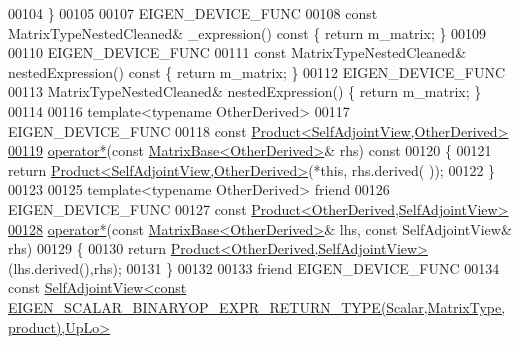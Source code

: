 \begin{DoxyCode}
00104     \}
00105 
00107     EIGEN\_DEVICE\_FUNC
00108     \textcolor{keyword}{const} MatrixTypeNestedCleaned& \_expression()\textcolor{keyword}{ const }\{ \textcolor{keywordflow}{return} m\_matrix; \}
00109 
00110     EIGEN\_DEVICE\_FUNC
00111     \textcolor{keyword}{const} MatrixTypeNestedCleaned& nestedExpression()\textcolor{keyword}{ const }\{ \textcolor{keywordflow}{return} m\_matrix; \}
00112     EIGEN\_DEVICE\_FUNC
00113     MatrixTypeNestedCleaned& nestedExpression() \{ \textcolor{keywordflow}{return} m\_matrix; \}
00114 
00116     \textcolor{keyword}{template}<\textcolor{keyword}{typename} OtherDerived>
00117     EIGEN\_DEVICE\_FUNC
00118     \textcolor{keyword}{const} \hyperlink{group___core___module_class_eigen_1_1_product}{Product<SelfAdjointView,OtherDerived>}
\hyperlink{group___core___module_a726e801c8867ce4ec11317fd6034069b}{00119}     \hyperlink{group___core___module_a726e801c8867ce4ec11317fd6034069b}{operator*}(\textcolor{keyword}{const} \hyperlink{group___core___module_class_eigen_1_1_matrix_base}{MatrixBase<OtherDerived>}& rhs)\textcolor{keyword}{ const}
00120 \textcolor{keyword}{    }\{
00121       \textcolor{keywordflow}{return} \hyperlink{group___core___module_class_eigen_1_1_product}{Product<SelfAdjointView,OtherDerived>}(*\textcolor{keyword}{this}, rhs.derived(
      ));
00122     \}
00123 
00125     \textcolor{keyword}{template}<\textcolor{keyword}{typename} OtherDerived> \textcolor{keyword}{friend}
00126     EIGEN\_DEVICE\_FUNC
00127     \textcolor{keyword}{const} \hyperlink{group___core___module_class_eigen_1_1_product}{Product<OtherDerived,SelfAdjointView>}
\hyperlink{group___core___module_ade82565a894a08671879228863881f84}{00128}     \hyperlink{group___core___module_ade82565a894a08671879228863881f84}{operator*}(\textcolor{keyword}{const} \hyperlink{group___core___module_class_eigen_1_1_matrix_base}{MatrixBase<OtherDerived>}& lhs, \textcolor{keyword}{const} SelfAdjointView& 
      rhs)
00129     \{
00130       \textcolor{keywordflow}{return} \hyperlink{group___core___module_class_eigen_1_1_product}{Product<OtherDerived,SelfAdjointView>}(lhs.derived(),rhs);
00131     \}
00132     
00133     \textcolor{keyword}{friend} EIGEN\_DEVICE\_FUNC
00134     \textcolor{keyword}{const} 
      \hyperlink{group___core___module_class_eigen_1_1_self_adjoint_view}{SelfAdjointView<const EIGEN\_SCALAR\_BINARYOP\_EXPR\_RETURN\_TYPE(Scalar,MatrixType,product),UpLo>}

\end{DoxyCode}
